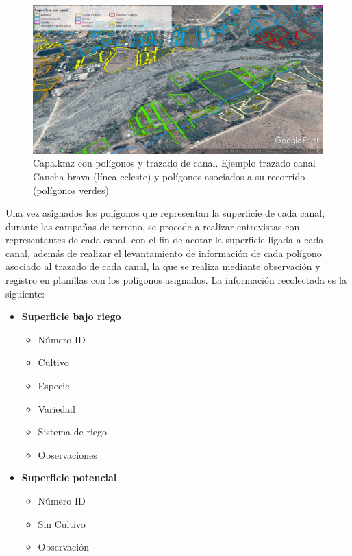 \documentclass[]{article}
\begin{document}
\begin{figure}[H]
\centering
\includegraphics[width=\textwidth]{images/capa_kmz_area.eps}
\caption{Capa.kmz con polígonos y trazado de canal. Ejemplo trazado canal Cancha brava (línea celeste) y polígonos asociados a su recorrido (polígonos verdes)}
\label{poligonos}
\end{figure}

Una vez asignados los polígonos que representan la superficie de cada canal, durante las campañas de terreno, se procede a realizar entrevistas con representantes de cada canal, con el fin de acotar la superficie ligada a cada canal, además de realizar el levantamiento de información de cada polígono asociado al trazado de cada canal, la que se realiza mediante observación y registro en planillas con los polígonos asignados. La información recolectada es la siguiente:

\begin{itemize}
	\item \textbf{Superficie bajo riego}
	\begin{itemize}	
		\item Número ID
		\item Cultivo
		\item Especie
		\item Variedad
		\item Sistema de riego
		\item Observaciones
	\end{itemize}
	\item \textbf{Superficie potencial}
	\begin{itemize}	
		\item Número ID
		\item Sin Cultivo
		\item Observación
	\end{itemize}
\end{itemize}
\end{document}
